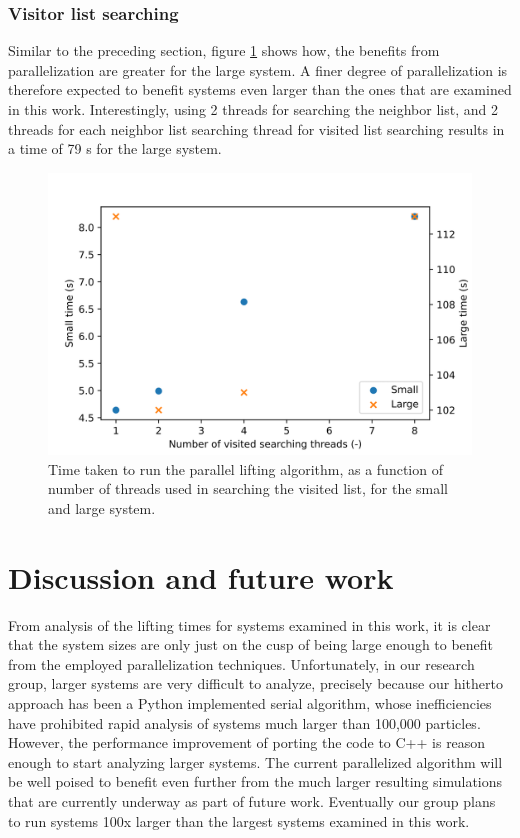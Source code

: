 \documentclass{article}
\begin{document}
\subsubsection{Visitor list searching}
Similar to the preceding section, figure \ref{fig:VisitorSearching} shows how, the benefits from parallelization are greater for the large system. A finer degree of parallelization is therefore expected to benefit systems even larger than the ones that are examined in this work. Interestingly, using 2 threads for searching the neighbor list, and 2 threads for each neighbor list searching thread for visited list searching results in a time of 79 s for the large system.
\begin{figure}[htp!]
    \includegraphics[scale=0.8]{VisitedSearching.png}
    \caption{Time taken to run the parallel lifting algorithm, as a function of number of threads used in searching the visited list, for the small and large system.}
    \centering
    \label{fig:VisitorSearching}
\end{figure}

\section{Discussion and future work}
From analysis of the lifting times for systems examined in this work, it is clear that the system sizes are only just on the cusp of being large enough to benefit from the employed parallelization techniques. Unfortunately, in our research group, larger systems are very difficult to analyze, precisely because our hitherto approach has been a Python implemented serial algorithm, whose inefficiencies have prohibited rapid analysis of systems much larger than 100,000 particles. However, the performance improvement of porting the code to C++ is reason enough to start analyzing larger systems. The current parallelized algorithm will be well poised to benefit even further from the much larger resulting simulations that are currently underway as part of future work. Eventually our group plans to run systems 100x larger than the largest systems examined in this work.
\end{document}

